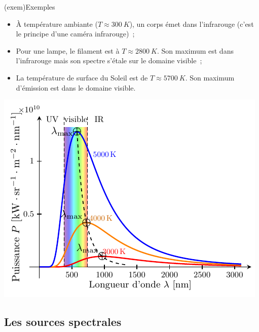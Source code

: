 \documentclass[../../main/main.tex]{subfiles}
\begin{document}
\begin{tcb}[sidebyside, lefthand ratio=.5](exem){Exemples}
	\begin{itemize}
		\item À température ambiante ($T \approx \SI{300}{K}$), un corps émet
		      dans l'infrarouge (c'est le principe d'une caméra infrarouge)~;
		\item Pour une lampe, le filament est à $T \approx \SI{2800}{K}$. Son
		      maximum est dans l'infrarouge mais son spectre s'étale sur le
		      domaine visible~;
		\item La température de surface du Soleil est de $T \approx
			      \SI{5700}{K}$. Son maximum d'émission est dans le domaine visible.
	\end{itemize}
	\begin{center}
		\pgfspectra[element={H,Fe,Mg,Na},
		absorption, line intensity=40, Imin=.05,
		axis, axis color=white, axis font color=black,
		axis ticks=4, axis unit precision=2,
		axis label text={Longueur d'onde [$\si{nm}$]},
		back=visible10,
		]
		\label{fig:spec_sun}
	\end{center}
	\tcblower
	\begin{center}
		\includegraphics[width=\linewidth]{blackbody}
		\label{fig:cps_chaud}
	\end{center}
\end{tcb}

\subsection{Les sources spectrales}
\end{document}
